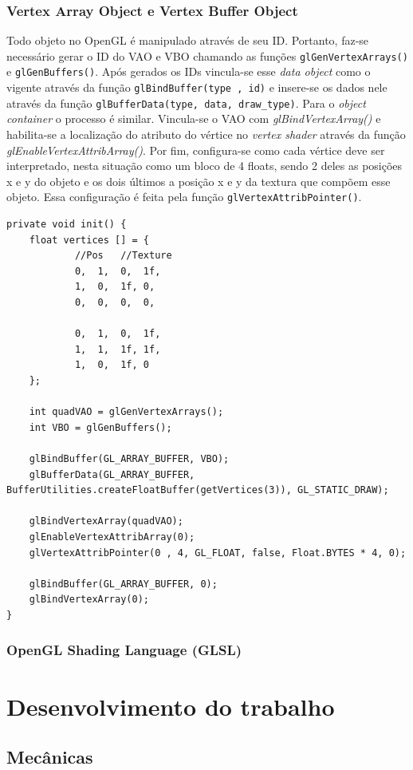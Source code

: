 \documentclass[12pt, 
openright, 
oneside, 
a4paper,    
brazil]{facom-ufu-abntex2}
\begin{document}
\subsection{Vertex Array Object e Vertex Buffer Object}
Todo objeto no OpenGL é manipulado através de seu ID. Portanto, faz-se necessário gerar o ID do VAO e VBO chamando as funções \texttt{glGenVertexArrays()} e \texttt{glGenBuffers()}. Após gerados os IDs vincula-se esse \textit{data object} como o vigente através da função \texttt{glBindBuffer(type , id)} e insere-se os dados nele através da função \texttt{glBufferData(type, data, draw_type)}. Para o \textit{object container} o processo é similar. Vincula-se o VAO com \textit{glBindVertexArray()} e habilita-se a localização do atributo do vértice no \textit{vertex shader} através da função \textit{glEnableVertexAttribArray()}. Por fim, configura-se como cada vértice deve ser interpretado, nesta situação como um bloco de 4 floats, sendo 2 deles as posições x e y do objeto e os dois últimos a posição x e y da textura que compõem esse objeto. Essa configuração é feita pela função \texttt{glVertexAttribPointer()}.

\begin{lstlisting}[caption=Inicialização do VBO e VAO]
private void init() {
	float vertices [] = {
			//Pos	//Texture
			0,	1,	0,	1f,
			1,	0,	1f,	0,
			0,	0,	0,	0,
			
			0,	1,	0,	1f,
			1,	1,	1f,	1f,
			1,	0,	1f,	0
	};
	
	int quadVAO = glGenVertexArrays();
	int VBO = glGenBuffers();
	
	glBindBuffer(GL_ARRAY_BUFFER, VBO);
	glBufferData(GL_ARRAY_BUFFER, BufferUtilities.createFloatBuffer(getVertices(3)), GL_STATIC_DRAW); 
	
	glBindVertexArray(quadVAO);
	glEnableVertexAttribArray(0);
	glVertexAttribPointer(0 , 4, GL_FLOAT, false, Float.BYTES * 4, 0);
	
	glBindBuffer(GL_ARRAY_BUFFER, 0);
	glBindVertexArray(0);
}
\end{lstlisting}

\subsection{OpenGL Shading Language (GLSL)}

\chapter{Desenvolvimento do trabalho}
\label{sec:desenv}
\section{Mecânicas}
\end{document}
